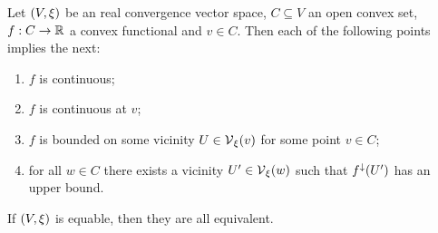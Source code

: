 \begin{proposition} \label{convexContinuity}
Let $\sSet{V,\xi}$ be an real convergence vector space, $C\subseteq V$ an open convex set, $f: C\to \mathbb{R}$ a convex functional and $v\in C$. Then each of the following points implies the next:
\begin{enumerate}
\item $f$ is continuous;
\item $f$ is continuous at $v$;
\item $f$ is bounded on some vicinity $U\in\operatorname{\mathcal{V}}_\xi(v)$ for some point $v\in C$;
\item for all $w\in C$ there exists a vicinity $U'\in\operatorname{\mathcal{V}}_\xi(w)$ such that $f^\downarrow(U')$ has an upper bound.
\end{enumerate}
If $\sSet{V,\xi}$ is equable, then they are all equivalent.
\end{proposition}
